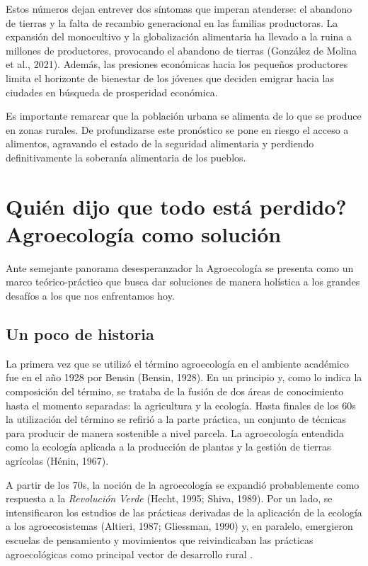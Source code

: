 \documentclass[a4paper, nobind]{templates/ociamthesis}
\begin{document}
Estos números dejan entrever dos síntomas que imperan atenderse: el
abandono de tierras y la falta de recambio generacional en las familias
productoras. La expansión del monocultivo y la globalización alimentaria
ha llevado a la ruina a millones de productores, provocando el abandono
de tierras (González de Molina et al., 2021). Además, las presiones económicas hacia los
pequeños productores limita el horizonte de bienestar de los jóvenes que
deciden emigrar hacia las ciudades en búsqueda de prosperidad económica.

Es importante remarcar que la población urbana se alimenta de lo que se
produce en zonas rurales. De profundizarse este pronóstico se pone en
riesgo el acceso a alimentos, agravando el estado de la seguridad
alimentaria y perdiendo definitivamente la soberanía alimentaria de los
pueblos.

\hypertarget{quiendijoperdido}{%
\section{\texorpdfstring{\textquestiondown Quién dijo que todo está perdido? Agroecología como solución}{Quién dijo que todo está perdido? Agroecología como solución}}\label{quiendijoperdido}}

Ante semejante panorama desesperanzador la Agroecología se presenta como
un marco teórico-práctico que busca dar soluciones de manera holística a
los grandes desafíos a los que nos enfrentamos hoy.

\hypertarget{historia_agroecologia}{%
\subsection{Un poco de historia}\label{historia_agroecologia}}

La primera vez que se utilizó el término agroecología en el ambiente
académico fue en el año 1928 por Bensin (Bensin, 1928). En
un principio y, como lo indica la composición del término, se trataba de
la fusión de dos áreas de conocimiento hasta el momento separadas: la
agricultura y la ecología. Hasta finales de los 60s la utilización del
término se refirió a la parte práctica, un conjunto de técnicas para
producir de manera sostenible a nivel parcela. La agroecología entendida
como la ecología aplicada a la producción de plantas y la gestión de
tierras agrícolas (Hénin, 1967).

A partir de los 70s, la noción de la agroecología se expandió
probablemente como respuesta a la \emph{Revolución Verde}
(Hecht, 1995; Shiva, 1989). Por un lado, se
intensificaron los estudios de las prácticas derivadas de la aplicación
de la ecología a los agroecosistemas (Altieri, 1987; Gliessman, 1990) y, en paralelo, emergieron escuelas de
pensamiento y movimientos que reivindicaban las prácticas agroecológicas
como principal vector de desarrollo rural .
\end{document}
